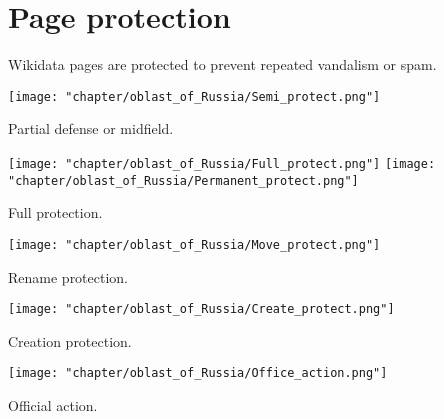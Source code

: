 \newpage
\section{Page protection}

Wikidata pages are protected to prevent repeated vandalism or spam.

\begin{marginfigure}[1.0cm]
{
	\setlength{\fboxsep}{0pt}%
	\setlength{\fboxrule}{1pt}%
	{\texttt{[image: "chapter/oblast\_of\_Russia/Semi\_protect.png"]}}
}
\caption [Icon. Partial defense or midfield.]{Partial defense or midfield.}%
\label{fig:legend_population}%
\end{marginfigure}

\begin{marginfigure}[3.5cm]
{
	\setlength{\fboxsep}{0pt}%
	\setlength{\fboxrule}{1pt}%
	{\texttt{[image: "chapter/oblast\_of\_Russia/Full\_protect.png"]}}
	{\texttt{[image: "chapter/oblast\_of\_Russia/Permanent\_protect.png"]}}
}
\caption [Icon. Full protection.]{Full protection.}%
\label{fig:legend_population}%
\end{marginfigure}

\begin{marginfigure}[6.0cm]
{
	\setlength{\fboxsep}{0pt}%
	\setlength{\fboxrule}{1pt}%
	{\texttt{[image: "chapter/oblast\_of\_Russia/Move\_protect.png"]}}
}
\caption [Icon. Protection against renaming.]{Rename protection.}%
\label{fig:legend_population}%
\end{marginfigure}

\begin{marginfigure}[8.5cm]
{
	\setlength{\fboxsep}{0pt}%
	\setlength{\fboxrule}{1pt}%
	{\texttt{[image: "chapter/oblast\_of\_Russia/Create\_protect.png"]}}
}
\caption [Icon. Protection from creation.]{Creation protection.}%
\label{fig:legend_population}%
\end{marginfigure}

\begin{marginfigure}[11.0cm]
{
	\setlength{\fboxsep}{0pt}%
	\setlength{\fboxrule}{1pt}%
	{\texttt{[image: "chapter/oblast\_of\_Russia/Office\_action.png"]}}
}
\caption [Icon. Official action.]{Official action.}%
\label{fig:legend_population}%
\end{marginfigure}

